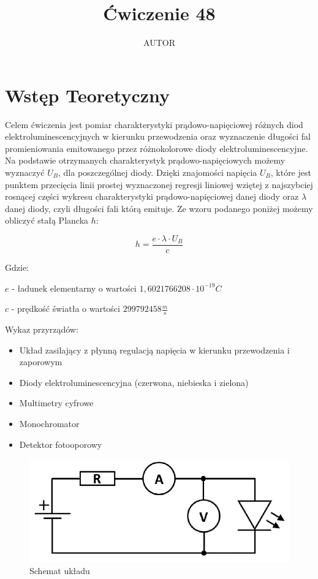 \documentclass{article}
\title{Ćwiczenie 48}
\author{AUTOR}
\date{}
\begin{document}
\maketitle

\section{Wstęp Teoretyczny}
\par Celem ćwiczenia jest pomiar charakterystyki prądowo-napięciowej różnych diod elektroluminescencyjnych w kierunku przewodzenia oraz wyznaczenie długości fal promieniowania emitowanego przez różnokolorowe diody elektroluminescencyjne.
Na podstawie otrzymanych charakterystyk prądowo-napięciowych możemy wyznaczyć $U_{B}$, dla poszczególnej diody. Dzięki znajomości napięcia $U_{B}$, które jest punktem przecięcia linii prostej wyznaczonej regresji liniowej wziętej z najszybciej rosnącej części wykresu charakterystyki prądowo-napięciowej danej diody oraz $\lambda$ danej diody, czyli długości fali którą emituje. Ze wzoru podanego poniżej możemy obliczyć stałą Plancka $h$:
\vspace{-3ex}
\begin{center}
    $$
    h=\frac{e\cdot \lambda \cdot U_{B}}{c}
    $$
\end{center}
Gdzie:
\par $e$ - ładunek elementarny o wartości $1,6021766208\cdot 10^{−19} C$
\vspace{1.5ex}
\par $c$ - prędkość światła o wartości $ 299 792 458 \frac{m}{s}$\\
\vspace{-2ex}
\begin{flushleft}

Wykaz przyrządów:
\end{flushleft}
\begin{itemize}
    \item Układ zasilający z płynną regulacją napięcia w kierunku przewodzenia i zaporowym
    \item Diody elektroluminescencyjna (czerwona, niebieska i zielona)
    \item Multimetry cyfrowe
    \item Monochromator
    \item Detektor fotooporowy
\end{itemize}


\begin{figure}[h!]
    \centering
    \includegraphics[scale=0.65]{Schemat.PNG}
    \caption{Schemat układu}
\end{figure}
\end{document}
